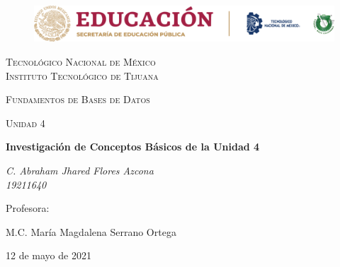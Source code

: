 \documentclass[letterpaper, 12pt]{article}
\begin{document}
    
    \begin{titlepage}
        \begin{figure}[ht]
            \centering
            \includegraphics[width=15cm]{logosITT.png}
        \end{figure}
        \centering
        {\scshape\LARGE Tecnológico Nacional de México\\Instituto Tecnológico de Tijuana\par}
        \vspace{1cm}
        {\scshape\Large Fundamentos de Bases de Datos\par}
        \vspace{1cm}
        {\scshape\Large Unidad 4\par}
        \vspace{1.5cm}
        {\huge\bfseries Investigación de Conceptos Básicos de la Unidad 4\par}
        \vspace{2cm}
        {\Large\itshape C. Abraham Jhared Flores Azcona\\19211640\par}
        \vfill
        Profesora: \par
        M.C. María Magdalena Serrano Ortega
    
        \vfill

        {\large 12 de mayo de 2021}
    \end{titlepage}

    \newpage
        \thispagestyle{empty}
        \tableofcontents %
        \listoffigures %
\end{document}
